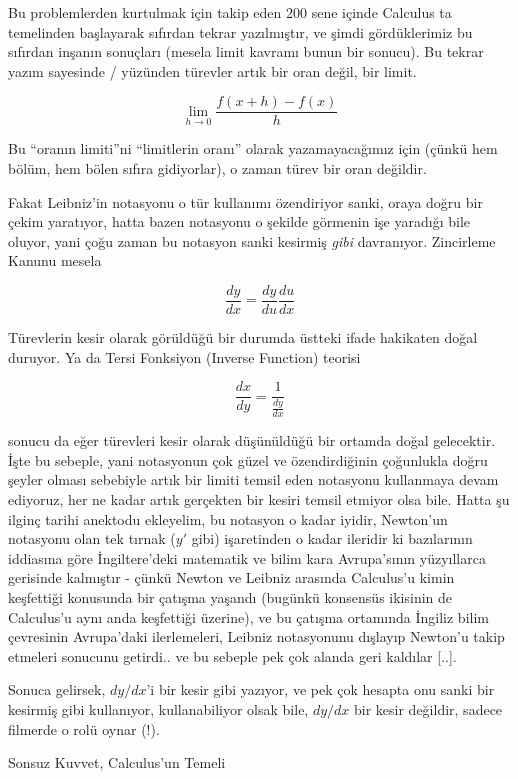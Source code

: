 \documentclass[12pt,fleqn]{article}\usepackage{../../common}
\begin{document}
Bu problemlerden kurtulmak için takip eden 200 sene içinde Calculus ta
temelinden başlayarak sıfırdan tekrar yazılmıştır, ve şimdi gördüklerimiz
bu sıfırdan inşanın sonuçları (mesela limit kavramı bunun bir sonucu). Bu
tekrar yazım sayesinde / yüzünden türevler artık bir oran değil, bir limit.

$$ \lim_{h \to 0} \frac{f(x+h) - f(x)}{h}$$

Bu ``oranın limiti''ni ``limitlerin oranı'' olarak yazamayacağımız için
(çünkü hem bölüm, hem bölen sıfıra gidiyorlar), o zaman türev bir oran
değildir.

Fakat Leibniz'in notasyonu o tür kullanımı özendiriyor sanki, oraya doğru bir
çekim yaratıyor, hatta bazen notasyonu o şekilde görmenin işe yaradığı bile
oluyor, yani çoğu zaman bu notasyon sanki kesirmiş {\em gibi}
davranıyor. Zincirleme Kanunu mesela

$$ \frac{dy}{dx} = \frac{dy}{du}\frac{du}{dx} $$

Türevlerin kesir olarak görüldüğü bir durumda üstteki ifade hakikaten doğal
duruyor. Ya da Tersi Fonksiyon (Inverse Function) teorisi

$$ \frac{dx}{dy} = \frac{1}{\frac{dy}{dx}} $$

sonucu da eğer türevleri kesir olarak düşünüldüğü bir ortamda doğal
gelecektir. İşte bu sebeple, yani notasyonun çok güzel ve özendirdiğinin
çoğunlukla doğru şeyler olması sebebiyle artık bir limiti temsil eden
notasyonu kullanmaya devam ediyoruz, her ne kadar artık gerçekten bir
kesiri temsil etmiyor olsa bile. Hatta şu ilginç tarihi anektodu ekleyelim,
bu notasyon o kadar iyidir, Newton'un notasyonu olan tek tırnak ($y'$ gibi)
işaretinden o kadar ileridir ki bazılarının iddiasına göre İngiltere'deki
matematik ve bilim kara Avrupa'sının yüzyıllarca gerisinde kalmıştır -
çünkü Newton ve Leibniz arasında Calculus'u kimin keşfettiği konusunda bir
çatışma yaşandı (bugünkü konsensüs ikisinin de Calculus'u aynı anda
keşfettiği üzerine), ve bu çatışma ortamında İngiliz bilim çevresinin
Avrupa'daki ilerlemeleri, Leibniz notasyonunu dışlayıp Newton'u takip
etmeleri sonucunu getirdi.. ve bu sebeple pek çok alanda geri kaldılar
[..].

Sonuca gelirsek, $dy/dx$'i bir kesir gibi yazıyor, ve pek çok hesapta onu
sanki bir kesirmiş gibi kullanıyor, kullanabiliyor olsak bile, $dy/dx$ bir
kesir değildir, sadece filmerde o rolü oynar (!).

\newpage 

Sonsuz Kuvvet, Calculus'un Temeli
\end{document}
